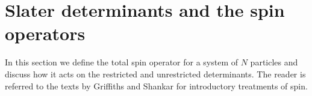 
\section{Slater determinants and the spin operators}
\label{sec:determinants_and_spin}
In this section we define the total spin operator for a system of $N$ particles and discuss how it acts on the restricted
and unrestricted determinants.
The reader is referred to the texts by Griffiths \cite{griffiths} and Shankar \cite{shankar} for introductory treatments of spin.

